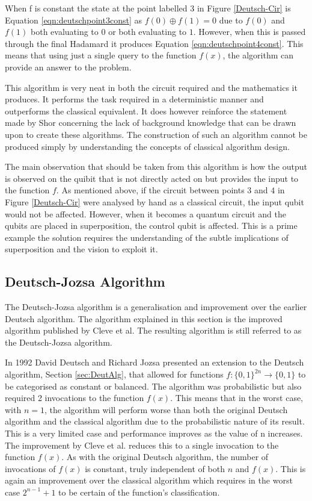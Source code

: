 When f is constant the state at the point labelled $3$ in Figure \ref{Deutsch-Cir} is Equation \ref{eqn:deutschpoint3const} as $f(0) \oplus f(1) = 0$ due to $f(0)$ and $f(1)$ both evaluating to $0$ or both evaluating to $1$.
However, when this is passed through the final Hadamard it produces Equation \ref{eqn:deutschpoint4const}.
This means that using just a single query to the function $f(x)$, the algorithm can provide an answer to the problem.

This algorithm is very neat in both the circuit required and the mathematics it produces.
It performs the task required in a deterministic manner and outperforms the classical equivalent.
It does however reinforce the statement made by Shor\cite{Shor:2004:PQA:1032132.1032149} concerning the lack of background knowledge that can be drawn upon to create these algorithms.
The construction of such an algorithm cannot be produced simply by understanding the concepts of classical algorithm design.

The main observation that should be taken from this algorithm is how the output is observed on the quibit that is not directly acted on but provides the input to the function $f$.
As mentioned above, if the circuit between points $3$ and $4$ in Figure \ref{Deutsch-Cir} were analysed by hand as a classical circuit, the input qubit would not be affected.
However, when it becomes a quantum circuit and the qubits are placed in superposition, the control qubit is affected.
This is a prime example the solution requires the understanding of the subtle implications of superposition and the vision to exploit it.

\subsection{Deutsch-Jozsa Algorithm}
\label{sec:DeutJozsaAlg}

The Deutsch-Jozsa algorithm\cite{1992-deutsch} is a generalisation and improvement over the earlier Deutsch algorithm\cite{Deutsch85quantumtheory}.
The algorithm explained in this section is the improved algorithm published by Cleve et al.\cite{Cleve98quantumalgorithms}
The resulting algorithm is still referred to as the Deutsch-Jozsa algorithm.

In 1992 David Deutsch and Richard Jozsa\cite{1992-deutsch} presented an extension to the Deutsch algorithm, Section \ref{sec:DeutAlg}, that allowed for functions $f:\{0,1\}^{2n}\to\{0,1\}$ to be categorised as constant or balanced.
The algorithm was probabilistic but also required 2 invocations to the function $f(x)$.
This means that in the worst case, with $n=1$, the algorithm will perform worse than both the original Deutsch algorithm\cite{Deutsch85quantumtheory} and the classical algorithm due to the probabilistic nature of its result.
This is a very limited case and performance improves as the value of n increases.
The improvement by Cleve et al. reduces this to a single invocation to the function $f(x)$.
As with the original Deutsch algorithm, the number of invocations of $f(x)$ is constant, truly independent of both $n$ and $f(x)$.
This is again an improvement over the classical algorithm which requires in the worst case $2^{n-1}+1$ to be certain of the function's classification.

